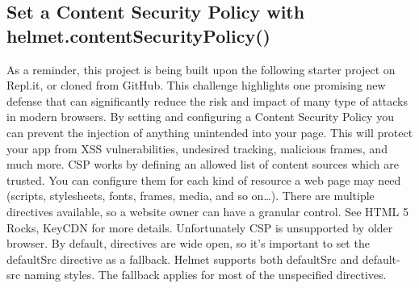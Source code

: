 \documentclass{article}%
\begin{document}
\subsection{Set a Content Security Policy with helmet.contentSecurityPolicy()}%
\label{subsec:SetaContentSecurityPolicywithhelmet.contentSecurityPolicy()}%
As a reminder, this project is being built upon the following starter project on Repl.it, or cloned from GitHub.\newline%
This challenge highlights one promising new defense that can significantly reduce the risk and impact of many type of attacks in modern browsers. By setting and configuring a Content Security Policy you can prevent the injection of anything unintended into your page. This will protect your app from XSS vulnerabilities, undesired tracking, malicious frames, and much more. CSP works by defining an allowed list of content sources which are trusted. You can configure them for each kind of resource a web page may need (scripts, stylesheets, fonts, frames, media, and so on…). There are multiple directives available, so a website owner can have a granular control. See HTML 5 Rocks, KeyCDN for more details. Unfortunately CSP is unsupported by older browser.\newline%
By default, directives are wide open, so it’s important to set the defaultSrc directive as a fallback. Helmet supports both defaultSrc and default{-}src naming styles. The fallback applies for most of the unspecified directives.\newline%

%
\end{document}
